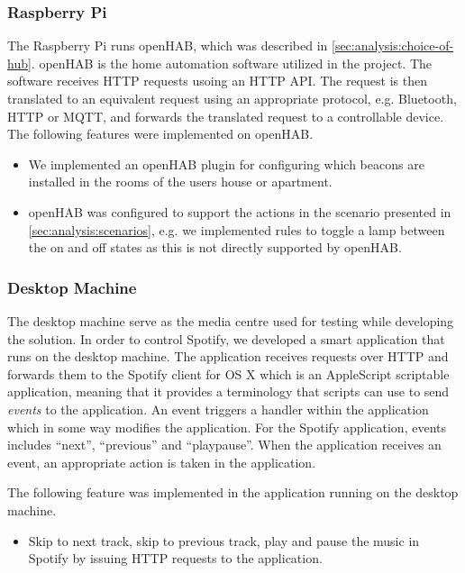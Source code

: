 \subsubsection{Raspberry Pi}

The Raspberry Pi runs openHAB, which was described in \cref{sec:analysis:choice-of-hub}. openHAB is the home automation software utilized in the project. The software receives HTTP requests usoing an HTTP API. The request is then translated to an equivalent request using an appropriate protocol, e.g. Bluetooth, HTTP or MQTT, and forwards the translated request to a controllable device. The following features were implemented on openHAB.

\begin{itemize}
\item We implemented an openHAB plugin for configuring which beacons are installed in the rooms of the users house or apartment.
\item openHAB was configured to support the actions in the scenario presented in \cref{sec:analysis:scenarios}, e.g. we implemented rules to toggle a lamp between the on and off states as this is not directly supported by openHAB.
\end{itemize}

\subsubsection{Desktop Machine}

The desktop machine serve as the media centre used for testing while developing the solution. In order to control Spotify, we developed a smart application that runs on the desktop machine. The application receives requests over HTTP and forwards them to the Spotify client for OS X which is an AppleScript scriptable application, meaning that it provides a terminology that scripts can use to send \emph{events} to the application. An event triggers a handler within the application which in some way modifies the application. For the Spotify application, events includes ``next'', ``previous'' and ``playpause''. When the application receives an event, an appropriate action is taken in the application.

The following feature was implemented in the application running on the desktop machine.

\begin{itemize}
\item Skip to next track, skip to previous track, play and pause the music in Spotify by issuing HTTP requests to the application.
\end{itemize}

